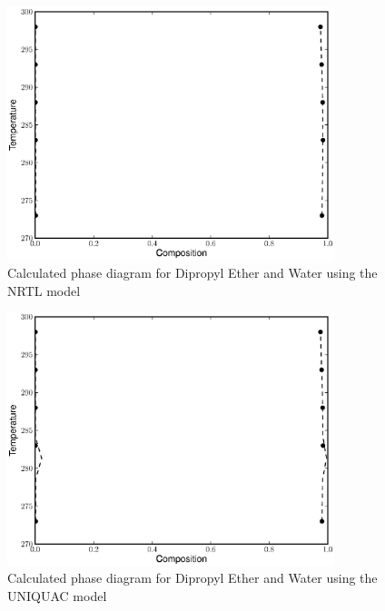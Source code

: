 \begin{figure}[hp]
\centering
\includegraphics[width = 0.85\textwidth]{Results_Parts/BinaryParams/dipropylether-water/NRTL/PhaseDiagram.eps}
\caption{Calculated phase diagram for Dipropyl Ether and Water using the NRTL model} \label{NRTLdipropylether-water}
\end{figure}	

\begin{figure}[hp]
\centering
\includegraphics[width = 0.85\textwidth]{Results_Parts/BinaryParams/dipropylether-water/UNIQUAC/PhaseDiagram.eps}
\caption{Calculated phase diagram for Dipropyl Ether and Water using the UNIQUAC model} \label{UNIQUACdipropylether-water}
\end{figure}	


\clearpage


